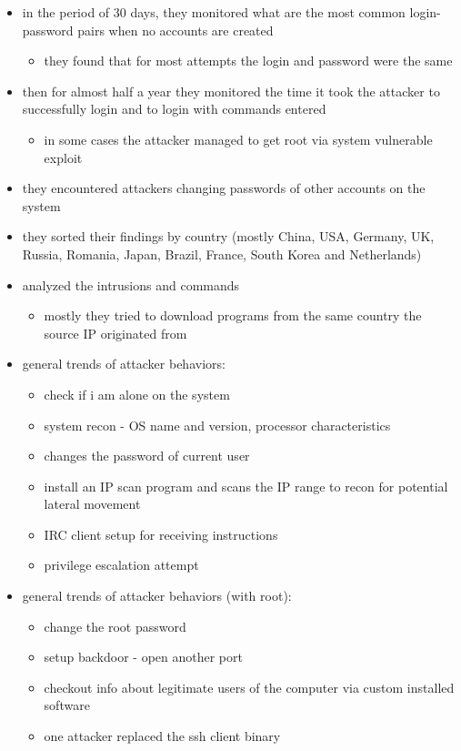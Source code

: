 \begin{itemize}[noitemsep]
	\item
	in the period of 30 days, they monitored what are the most common login-password pairs when no accounts are created
	
	\begin{itemize}
		\item
		they found that for most attempts the login and password were the same
	\end{itemize}
	\item
	then for almost half a year they monitored the time it took the attacker to successfully login and to login with commands entered
	
	\begin{itemize}
		\item
		in some cases the attacker managed to get root via system vulnerable exploit
	\end{itemize}
	\item
	they encountered attackers changing passwords of other accounts on the system
	\item
	they sorted their findings by country (mostly China, USA, Germany, UK, Russia, Romania, Japan, Brazil, France, South Korea and Netherlands)
	\item
	analyzed the intrusions and commands
	
	\begin{itemize}
		\item
		mostly they tried to download programs from the same country the source IP originated from
	\end{itemize}
	\item
	general trends of attacker behaviors:
	
	\begin{itemize}
		\item
		check if i am alone on the system
		\item
		system recon - OS name and version, processor characteristics
		\item
		changes the password of current user
		\item
		install an IP scan program and scans the IP range to recon for
		potential lateral movement
		\item
		IRC client setup for receiving instructions
		\item
		privilege escalation attempt
	\end{itemize}
	\item
	general trends of attacker behaviors (with root):
	
	\begin{itemize}
		\item
		change the root password
		\item
		setup backdoor - open another port
		\item
		checkout info about legitimate users of the computer via custom installed software
		\item
		one attacker replaced the ssh client binary
	\end{itemize}
\end{itemize}

